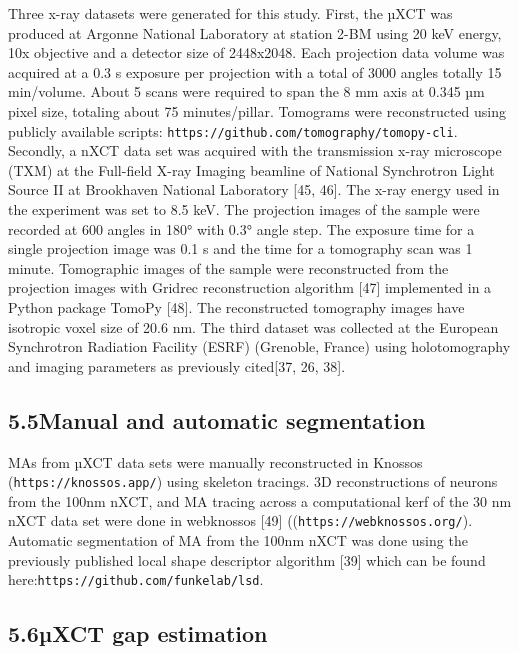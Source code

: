 \documentclass{article}
\begin{document}
Three x-ray datasets were generated for this study. First, the µXCT was produced at Argonne National Laboratory at station 2-BM using 20 keV energy, 10x objective and a detector size of 2448x2048. Each projection data volume was acquired at a 0.3 s exposure per projection with a total of 3000 angles totally 15 min/volume. About 5 scans were required to span the 8 mm axis at 0.345 µm pixel size, totaling about 75 minutes/pillar. Tomograms were reconstructed using publicly available scripts: \texttt{https://github.com/tomography/tomopy-cli}. Secondly, a nXCT data set was acquired with the transmission x-ray microscope (TXM) at the Full-field X-ray Imaging beamline of National Synchrotron Light Source II at Brookhaven National Laboratory [45, 46]. The x-ray energy used in the experiment was set to 8.5 keV. The projection images of the sample were recorded at 600 angles in 180° with 0.3° angle step. The exposure time for a single projection image was 0.1 s and the time for a tomography scan was 1 minute. Tomographic images of the sample were reconstructed from the projection images with Gridrec reconstruction algorithm [47] implemented in a Python package TomoPy [48]. The reconstructed tomography images have isotropic voxel size of 20.6 nm. The third dataset was collected at the European Synchrotron Radiation Facility (ESRF) (Grenoble, France) using holotomography and imaging parameters as previously cited[37, 26, 38].

\subsection*{5.5\quad Manual and automatic segmentation}

MAs from µXCT data sets were manually reconstructed in Knossos (\texttt{https://knossos.app/}) using skeleton tracings. 3D reconstructions of neurons from the 100nm nXCT, and MA tracing across a computational kerf of the 30 nm nXCT data set were done in webknossos [49] ((\texttt{https:}\texttt{//webknossos.org/}). Automatic segmentation of MA from the 100nm nXCT was done using the previously published local shape descriptor algorithm [39] which can be found here:\texttt{https:}\texttt{//github.com/funkelab/lsd}.

\subsection*{5.6\quad µXCT gap estimation}
\end{document}
